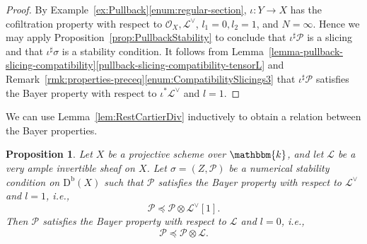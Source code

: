 \documentclass[11pt, reqno]{amsart}
\numberwithin{equation}{section}
\theoremstyle{plain}
\newtheorem{proposition}[theorem]{Proposition}
\theoremstyle{remark}
\theoremstyle{definition}
\theoremstyle{italicsname}
\newcommand{\Db}{\mathrm{D^b}}
\newcommand{\cO}{\mathcal{O}}
\newcommand{\cL}{\mathcal{L}}
\newcommand{\cP}{\mathscr{P}}
\newcommand{\KK}{\mathbbm{k}}
\begin{document}
\begin{proof}
    By Example~\ref{ex:Pullback}\eqref{enum:regular-section}, $\iota \colon Y \to X$ has the cofiltration property with respect to $\cO_X, \cL^{\vee}$, $l_1 = 0, l_2 = 1$, and $N = \infty$. 
    Hence we may apply Proposition~\ref{prop:PullbackStability} to conclude that $\iota^{\sharp} \cP$ is a slicing and that $\iota^{\sharp} \sigma$ is a stability condition. 
    It follows from Lemma~\ref{lemma-pullback-slicing-compatibility}\ref{pullback-slicing-compatibility-tensorL} and Remark~\ref{rmk:properties-preceq}\ref{enum:CompatibilitySlicings3} that $\iota^{\sharp}\cP$ satisfies the Bayer property with respect to $\iota^*\cL^\vee$ and $l=1$.
\end{proof}

We can use Lemma~\ref{lem:RestCartierDiv} inductively to obtain a relation between the Bayer properties.

\begin{proposition}\label{prop:lvlimpliesbayer}
Let $X$ be a projective scheme over $\KK$, and let $\cL$ be a very ample invertible sheaf on $X$.
Let $\sigma=(Z, \cP)$ be a numerical stability condition on $\Db(X)$ such that $\cP$ satisfies the Bayer property with respect to $\cL^\vee$ and $l=1$, i.e.,
\[
\cP\preceq\cP\otimes\cL^\vee[1].
\]
Then $\cP$ satisfies the Bayer property with respect to $\cL$ and $l=0$, i.e., 
\[
\cP\preceq\cP\otimes\cL.
\]
\end{proposition}
\end{document}
